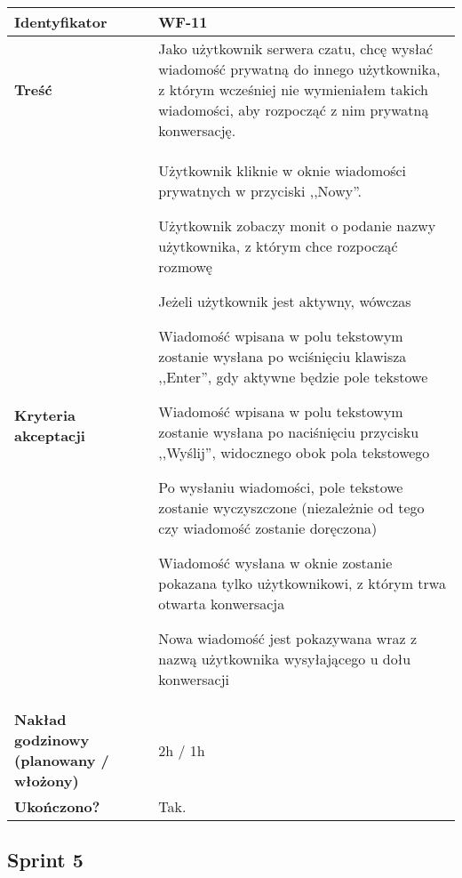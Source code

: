 \begin{tabular}{ | l | l | }
	\hline
		\textbf{Identyfikator} &
		WF-11
		\\

	\hline
		\textbf{Treść} & \parbox[t]{11.5cm}{\strut
			Jako użytkownik serwera czatu, chcę wysłać wiadomość
			prywatną do innego użytkownika, z którym wcześniej nie
			wymieniałem takich wiadomości, aby rozpocząć z nim
			prywatną konwersację.
		\strut}\\

	\hline
		\parbox[t]{4cm}{\textbf{Kryteria akceptacji}} & \parbox[t]{11.5cm}{\strut
			\begin{enumreq}
				\item Użytkownik kliknie w oknie wiadomości
				prywatnych w przyciski ,,Nowy''.
				\item Użytkownik zobaczy monit o podanie nazwy
				użytkownika, z którym chce rozpocząć rozmowę
				\item Jeżeli użytkownik jest aktywny, wówczas
				\item Wiadomość wpisana w polu tekstowym zostanie
				wysłana po wciśnięciu klawisza ,,Enter'', gdy
				aktywne
				będzie pole tekstowe
				\item Wiadomość wpisana w polu tekstowym zostanie
				wysłana po naciśnięciu przycisku ,,Wyślij'',
				widocznego obok pola tekstowego
				\item Po wysłaniu wiadomości, pole tekstowe zostanie
				wyczyszczone (niezależnie od tego czy wiadomość
				zostanie doręczona)
				\item Wiadomość wysłana w oknie zostanie pokazana
				tylko użytkownikowi, z którym trwa otwarta
				konwersacja
				\item Nowa wiadomość jest pokazywana wraz z nazwą
				użytkownika wysyłającego u dołu konwersacji
			\end{enumreq}
			\strut}
		\\
    \hline
      \parbox[t]{4cm}{\textbf{Nakład godzinowy (planowany / włożony)}} &
      \parbox[t]{11.5cm}{\strut
        2h / 1h
      \strut}\\

      \hline
        \parbox[t]{4cm}{\textbf{Ukończono?}} &
        \parbox[t]{11.5cm}{\strut
          Tak.
        \strut}\\

	\hline
\end{tabular}


\subsection{Sprint 5}

